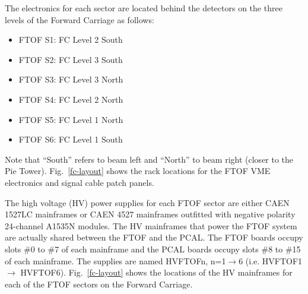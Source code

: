 \documentclass[12pt]{article}
\begin{document}
The electronics for each sector are located behind the detectors on the three levels of 
the Forward Carriage as follows:

\vskip 0.5cm

\begin{minipage}{0.5\textwidth}
\begin{itemize}
\item FTOF S1: FC Level 2 South
\item FTOF S2: FC Level 3 South
\item FTOF S3: FC Level 3 North
\end{itemize}
\end{minipage}
\begin{minipage}{0.5\textwidth}
\begin{itemize}
\item FTOF S4: FC Level 2 North
\item FTOF S5: FC Level 1 North
\item FTOF S6: FC Level 1 South
\end{itemize}
\end{minipage}

\vskip 0.5cm

Note that ``South'' refers to beam left and ``North'' to beam right (closer to the Pie 
Tower). Fig.~\ref{fc-layout} shows the rack locations for the FTOF VME electronics and 
signal cable patch panels. 

The high voltage (HV) power supplies for each FTOF sector are either CAEN 1527LC 
mainframes or CAEN 4527 mainframes outfitted with negative polarity 24-channel A1535N 
modules. The HV mainframes that power the FTOF system are actually shared between the 
FTOF and the PCAL. The FTOF boards occupy slots \#0 to \#7 of each mainframe and the 
PCAL boards occupy slots \#8 to \#15 of each mainframe. The supplies are named HVFTOFn, 
n=1$\to$6 (i.e. HVFTOF1 $\to$ HVFTOF6). Fig.~\ref{fc-layout} shows the locations of the 
HV mainframes for each of the FTOF sectors on the Forward Carriage.
\end{document}
